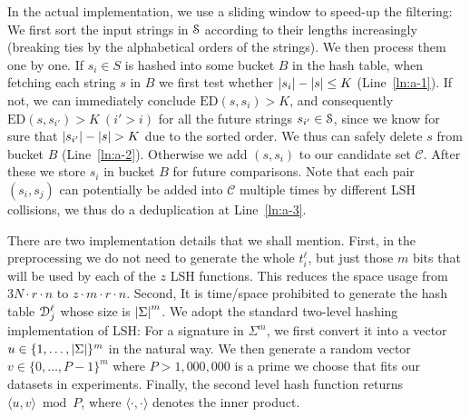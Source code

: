 In the actual implementation, we use a sliding window to speed-up the filtering: We first sort the input strings in $\S$ according to their lengths increasingly (breaking ties by the alphabetical orders of the strings).  We then process them one by one. If $s_i \in S$ is hashed into some bucket $B$ in the hash table, when fetching each string $s$ in $B$ we first test whether $\abs{s_i} - \abs{s} \le K$ (Line~\ref{ln:a-1}).  If not, we can immediately conclude $\text{ED}(s, s_i) > K$, and consequently $\text{ED}(s, s_{i'}) > K \ (i' > i)$ for all the future strings $s_{i'} \in \S$, since we know for sure that $\abs{s_{i'}} - \abs{s} > K$ due to the sorted order. We thus can safely delete $s$ from bucket $B$ (Line~\ref{ln:a-2}).  Otherwise we add $(s, s_i)$ to our candidate set $\mathcal{C}$.  After these we store $s_i$ in bucket $B$ for future comparisons.  Note that each pair $(s_i, s_j)$ can potentially be added into $\mathcal{C}$ multiple times by different LSH collisions, we thus do a deduplication at Line~\ref{ln:a-3}.

There are two implementation details that we shall mention.  First, in the preprocessing we do not need to generate the whole $t_i^\ell$, but just those $m$ bits that will be used by each of the $z$ LSH functions. This reduces the space usage from $3N \cdot r \cdot n$ to $z \cdot m \cdot r \cdot n$.  Second, It is time/space prohibited to generate the hash table $\D_j^\ell$ whose size is $\abs{\Sigma}^m$.  We adopt the standard two-level hashing implementation of LSH:  For a signature in $\Sigma^m$, we first convert it into a vector $u \in \{1, \ldots, \abs{\Sigma}\}^m$ in the natural way.  We then generate a random vector $v \in \{0, \ldots, P - 1\}^m$ where $P > 1,000,000$ is a prime we choose that fits our datasets in experiments.  Finally, the second level hash function returns $\langle u, v\rangle \bmod P$, where $\langle \cdot, \cdot \rangle$ denotes the inner product.

